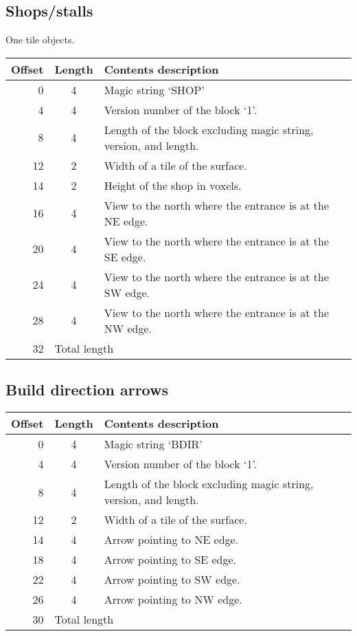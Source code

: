 \documentclass{article}
\begin{document}
\subsection{Shops/stalls}
One tile objects.

\begin{center}
\begin{tabular}{|r|c|l|} \hline
\textbf{Offset} & \textbf{Length} & \textbf{Contents description} \\ \hline
   0 &  4 & Magic string `SHOP' \\
   4 &  4 & Version number of the block `1'. \\
   8 &  4 & Length of the block excluding magic string, version, and length. \\
  12 &  2 & Width of a tile of the surface. \\
  14 &  2 & Height of the shop in voxels. \\
  16 &  4 & View to the north where the entrance is at the NE edge. \\
  20 &  4 & View to the north where the entrance is at the SE edge. \\
  24 &  4 & View to the north where the entrance is at the SW edge. \\
  28 &  4 & View to the north where the entrance is at the NW edge. \\ \hline
  32 & \multicolumn{2}{l|}{Total length} \\ \hline
\end{tabular}
\end{center}


\subsection{Build direction arrows}
\begin{center}
\begin{tabular}{|r|c|l|} \hline
\textbf{Offset} & \textbf{Length} & \textbf{Contents description} \\ \hline
   0 &  4 & Magic string `BDIR' \\
   4 &  4 & Version number of the block `1'. \\
   8 &  4 & Length of the block excluding magic string, version, and length. \\
  12 &  2 & Width of a tile of the surface. \\
  14 &  4 & Arrow pointing to NE edge. \\
  18 &  4 & Arrow pointing to SE edge. \\
  22 &  4 & Arrow pointing to SW edge. \\
  26 &  4 & Arrow pointing to NW edge. \\ \hline
  30 & \multicolumn{2}{l|}{Total length} \\ \hline
\end{tabular}
\end{center}
\end{document}
